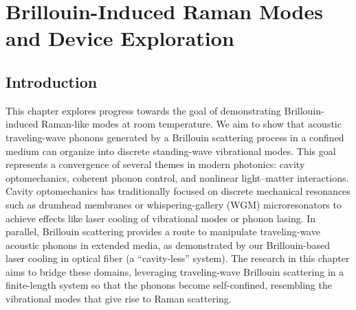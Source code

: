\setcounter{rownumber}{0}
\singlespacing
\chapter{Brillouin-Induced Raman Modes and Device Exploration}
\label{ch:Raman}
\acresetall

\doublespacing


\section{Introduction}
\label{sec:Raman:Introduction}

This chapter explores progress towards the goal of demonstrating Brillouin-induced Raman-like modes at room temperature. We aim to show that acoustic traveling-wave phonons generated by a Brillouin scattering process in a confined medium can organize into discrete standing-wave vibrational modes. This goal represents a convergence of several themes in modern photonics: cavity optomechanics, coherent phonon control, and nonlinear light–matter interactions. Cavity optomechanics has traditionally focused on discrete mechanical resonances such as drumhead membranes or whispering-gallery (\ac{WGM}) microresonators to achieve effects like laser cooling of vibrational modes or phonon lasing. \cite{kippenberg2008cavity, chan2011laser, aspelmeyer2014cavity, vahala2009phonon} In parallel, Brillouin scattering provides a route to manipulate traveling-wave acoustic phonons in extended media, as demonstrated by our Brillouin-based laser cooling in optical fiber (a “cavity-less” system). \cite{johnson2023laser, eggleton2013inducing, bahl2012observation, otterstrom2018optomechanical} The research in this chapter aims to bridge these domains, leveraging traveling-wave Brillouin scattering in a finite-length system so that the phonons become self-confined, resembling the vibrational modes that give rise to Raman scattering.

